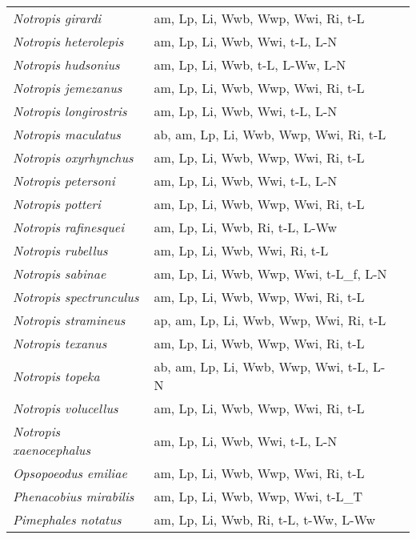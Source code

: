 {\begin{longtable}[c]{p{3.5cm}p{5.5cm}p{5.5cm}}
\emph{Notropis girardi} &  am, Lp, Li, Wwb, Wwp, Wwi, Ri, t-L & \citet{Cobu1986} \\
\emph{Notropis heterolepis} &  am, Lp, Li, Wwb, Wwi, t-L, L-N & \citet{EmerWall1974,RobeBroo2006} \\
\emph{Notropis hudsonius} &  am, Lp, Li, Wwb, t-L, L-Ww, L-N & \citet{WellHous1974,Cobu1986} \\
\emph{Notropis jemezanus} &  am, Lp, Li, Wwb, Wwp, Wwi, Ri, t-L &  \\
\emph{Notropis longirostris} &  am, Lp, Li, Wwb, Wwi, t-L, L-N & \citet{HeinClem1976} \\
\emph{Notropis maculatus} &  ab, am, Lp, Li, Wwb, Wwp, Wwi, Ri, t-L &  \\
\emph{Notropis oxyrhynchus} &  am, Lp, Li, Wwb, Wwp, Wwi, Ri, t-L & \citet{Mark1999,Cobu1986} \\
\emph{Notropis petersoni} &  am, Lp, Li, Wwb, Wwi, t-L, L-N & \citet{DaviLoud1971} \\
\emph{Notropis potteri} &  am, Lp, Li, Wwb, Wwp, Wwi, Ri, t-L & \citet{Cobu1986} \\
\emph{Notropis rafinesquei} &  am, Lp, Li, Wwb, Ri, t-L, L-Ww & \citet{HaagComm2007} \\
\emph{Notropis rubellus} &  am, Lp, Li, Wwb, Wwi, Ri, t-L & \citet{Reed1957} \\
\emph{Notropis sabinae} &  am, Lp, Li, Wwb, Wwp, Wwi, t-L\_f, L-N & \citet{Hein1986} \\
\emph{Notropis spectrunculus} &  am, Lp, Li, Wwb, Wwp, Wwi, Ri, t-L & \citet{OlsoMart2016} \\
\emph{Notropis stramineus} &  ap, am, Lp, Li, Wwb, Wwp, Wwi, Ri, t-L & \citet{SummMinc1969} \\
\emph{Notropis texanus} &  am, Lp, Li, Wwb, Wwp, Wwi, Ri, t-L &  \\
\emph{Notropis topeka} &  ab, am, Lp, Li, Wwb, Wwp, Wwi, t-L, L-N & \citet{Dahl2001} \\
\emph{Notropis volucellus} &  am, Lp, Li, Wwb, Wwp, Wwi, Ri, t-L &  \\
\emph{Notropis xaenocephalus} &  am, Lp, Li, Wwb, Wwi, t-L, L-N & \citet{JollPowe2008} \\
\emph{Opsopoeodus emiliae} &  am, Lp, Li, Wwb, Wwp, Wwi, Ri, t-L &  \\
\emph{Phenacobius mirabilis} &  am, Lp, Li, Wwb, Wwp, Wwi, t-L\_T & \citet{BestComp2007} \\
\emph{Pimephales notatus} &  am, Lp, Li, Wwb, Ri, t-L, t-Ww, L-Ww & \citet{Cobu1986,Gale1983,GillWeat1984} \\

\end{longtable}}
